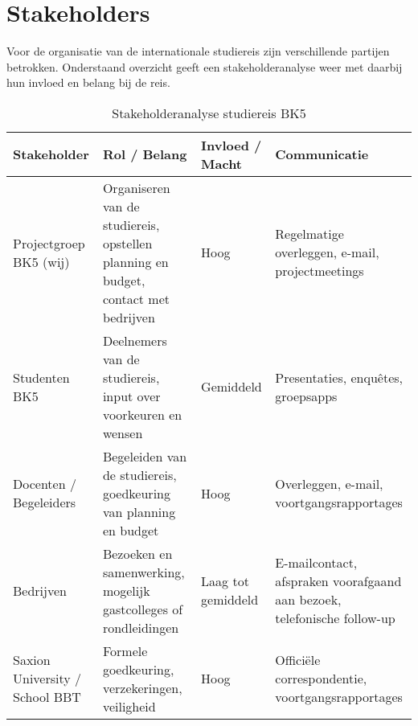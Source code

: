 \section{Stakeholders}

Voor de organisatie van de internationale studiereis zijn verschillende partijen betrokken. Onderstaand overzicht geeft een stakeholderanalyse weer met daarbij hun invloed en belang bij de reis.

\begin{table}[h!]
	\centering
	\caption{Stakeholderanalyse studiereis BK5}
	\label{tab:stakeholders}
	\begin{tabular}{|l|p{4.5cm}|l|p{4.5cm}|}
		\hline
		\textbf{Stakeholder} & \textbf{Rol / Belang} & \textbf{Invloed / Macht} & \textbf{Communicatie} \\
		\hline
		Projectgroep BK5 (wij) & Organiseren van de studiereis, opstellen planning en budget, contact met bedrijven & Hoog & Regelmatige overleggen, e-mail, projectmeetings \\
		\hline
		Studenten BK5 & Deelnemers van de studiereis, input over voorkeuren en wensen & Gemiddeld & Presentaties, enquêtes, groepsapps \\
		\hline
		Docenten / Begeleiders & Begeleiden van de studiereis, goedkeuring van planning en budget & Hoog & Overleggen, e-mail, voortgangsrapportages \\
		\hline
		Bedrijven & Bezoeken en samenwerking, mogelijk gastcolleges of rondleidingen & Laag tot gemiddeld & E-mailcontact, afspraken voorafgaand aan bezoek, telefonische follow-up \\
		\hline
		Saxion University / School BBT & Formele goedkeuring, verzekeringen, veiligheid & Hoog & Officiële correspondentie, voortgangsrapportages \\
		\hline
	\end{tabular}
	
\end{table}